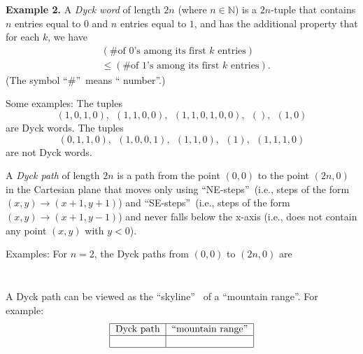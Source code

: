 \bigskip

\textbf{Example 2.} A \emph{Dyck word} of length $2n$ (where $n\in\mathbb{N}$)
is a $2n$-tuple that contains $n$ entries equal to $0$ and $n$ entries equal
to $1$, and has the additional property that for each $k$, we have
\begin{align}
&  \left(  \text{\# of }0\text{'s among its first }k\text{ entries}\right)
\nonumber\\
&  \leq\left(  \text{\# of }1\text{'s among its first }k\text{ entries}%
\right)  . \label{eq.sec.gf.exas.2.dyckword.leq}%
\end{align}
(The symbol \textquotedblleft\#\textquotedblright\ means \textquotedblleft
number\textquotedblright.)

Some examples: The tuples
\[
\left(  1,0,1,0\right)  ,\ \ \left(  1,1,0,0\right)  ,\ \ \left(
1,1,0,1,0,0\right)  ,\ \ \left(  {}\right)  ,\ \ \left(  1,0\right)
\]
are Dyck words. The tuples
\[
\left(  0,1,1,0\right)  ,\ \ \left(  1,0,0,1\right)  ,\ \ \left(
1,1,0\right)  ,\ \ \left(  1\right)  ,\ \ \left(  1,1,1,0\right)
\]
are not Dyck words.

A \emph{Dyck path} of length $2n$ is a path from the point $\left(
0,0\right)  $ to the point $\left(  2n,0\right)  $ in the Cartesian plane that
moves only using \textquotedblleft NE-steps\textquotedblright\ (i.e., steps of
the form $\left(  x,y\right)  \rightarrow\left(  x+1,y+1\right)  $) and
\textquotedblleft SE-steps\textquotedblright\ (i.e., steps of the form
$\left(  x,y\right)  \rightarrow\left(  x+1,y-1\right)  $) and never falls
below the x-axis (i.e., does not contain any point $\left(  x,y\right)  $ with
$y<0$).

Examples: For $n=2$, the Dyck paths from $\left(  0,0\right)  $ to $\left(
2n,0\right)  $ are%
\[%
\begin{tabular}
[c]{ccc}%
& $\ \ \ \ \ \ \ \ \ \ \ \ \ \ \ \ \ \ \ \ $ &
\end{tabular}
\]


A Dyck path can be viewed as the \textquotedblleft skyline\textquotedblright%
\ of a \textquotedblleft mountain range\textquotedblright. For example:%
\[%
\begin{tabular}
[c]{|c|c|}\hline
Dyck path & \textquotedblleft mountain range\textquotedblright\\\hline
\ \
\ \  & \ \
\ \ \\\hline
\end{tabular}
\]


